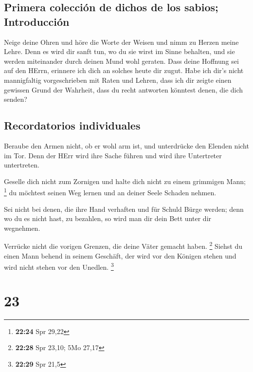 \hypertarget{primera-colecciuxf3n-de-dichos-de-los-sabios-introducciuxf3n}{%
\subsection{Primera colección de dichos de los sabios;
Introducción}\label{primera-colecciuxf3n-de-dichos-de-los-sabios-introducciuxf3n}}

 Neige deine Ohren und höre die Worte der Weisen und nimm
zu Herzen meine Lehre.  Denn es wird dir sanft tun, wo du
sie wirst im Sinne behalten, und sie werden miteinander durch deinen
Mund wohl geraten.  Dass deine Hoffnung sei auf den
HErrn, erinnere ich dich an solches heute dir zugut. 
Habe ich dir's nicht mannigfaltig vorgeschrieben mit Raten und Lehren,
 dass ich dir zeigte einen gewissen Grund der Wahrheit,
dass du recht antworten könntest denen, die dich senden?

\hypertarget{recordatorios-individuales}{%
\subsection{Recordatorios
individuales}\label{recordatorios-individuales}}

 Beraube den Armen nicht, ob er wohl arm ist, und
unterdrücke den Elenden nicht im Tor.  Denn der HErr wird
ihre Sache führen und wird ihre Untertreter untertreten.

 Geselle dich nicht zum Zornigen und halte dich nicht zu
einem grimmigen Mann; \footnote{\textbf{22:24} Spr 29,22}
 du möchtest seinen Weg lernen und an deiner Seele
Schaden nehmen.

 Sei nicht bei denen, die ihre Hand verhaften und für
Schuld Bürge werden;  denn wo du es nicht hast, zu
bezahlen, so wird man dir dein Bett unter dir wegnehmen.

 Verrücke nicht die vorigen Grenzen, die deine Väter
gemacht haben. \footnote{\textbf{22:28} Spr 23,10; 5Mo 27,17}
 Siehst du einen Mann behend in seinem Geschäft, der wird
vor den Königen stehen und wird nicht stehen vor den Unedlen.
\footnote{\textbf{22:29} Spr 21,5}

\hypertarget{section-22}{%
\section{23}\label{section-22}}


